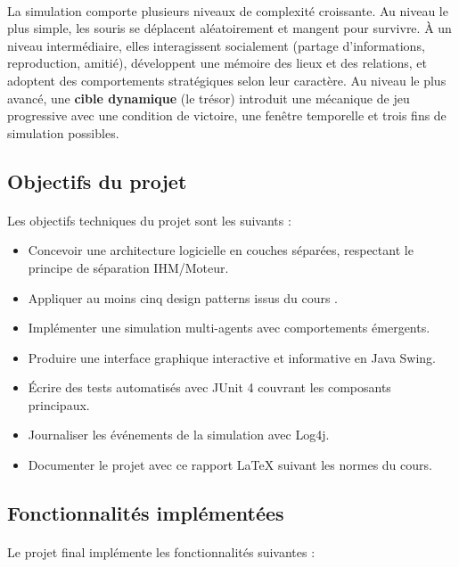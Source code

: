 \paragraph{} La simulation comporte plusieurs niveaux de complexité croissante. Au niveau le plus simple, les souris se déplacent aléatoirement et mangent pour survivre. À un niveau intermédiaire, elles interagissent socialement (partage d'informations, reproduction, amitié), développent une mémoire des lieux et des relations, et adoptent des comportements stratégiques selon leur caractère. Au niveau le plus avancé, une \textbf{cible dynamique} (le trésor) introduit une mécanique de jeu progressive avec une condition de victoire, une fenêtre temporelle et trois fins de simulation possibles.

\subsection{Objectifs du projet}

\paragraph{} Les objectifs techniques du projet sont les suivants :

\begin{itemize}
    \item Concevoir une architecture logicielle en couches séparées, respectant le principe de séparation IHM/Moteur.
    \item Appliquer au moins cinq design patterns issus du cours .
    \item Implémenter une simulation multi-agents avec comportements émergents.
    \item Produire une interface graphique interactive et informative en Java Swing.
    \item Écrire des tests automatisés avec JUnit 4 couvrant les composants principaux.
    \item Journaliser les événements de la simulation avec Log4j.
    \item Documenter le projet avec ce rapport \LaTeX{} suivant les normes du cours.
\end{itemize}

\subsection{Fonctionnalités implémentées}

\paragraph{} Le projet final implémente les fonctionnalités suivantes :

